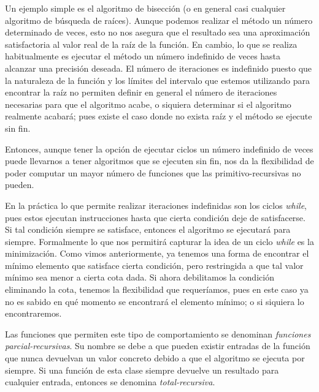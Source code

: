 Un ejemplo simple es el algoritmo de bisección (o en general casi cualquier algoritmo de búsqueda de raíces). Aunque podemos realizar el método un número determinado de veces, esto no nos asegura que el resultado sea una aproximación satisfactoria al valor real de la raíz de la función. En cambio, lo que se realiza habitualmente es ejecutar el método un número indefinido de veces hasta alcanzar una precisión deseada. El número de iteraciones es indefinido puesto que la naturaleza de la función y los límites del intervalo que estemos utilizando para encontrar la raíz no permiten definir en general el número de iteraciones necesarias para que el algoritmo acabe, o siquiera determinar si el algoritmo realmente acabará; pues existe el caso donde no exista raíz y el método se ejecute sin fin.

Entonces, aunque tener la opción de ejecutar ciclos un número indefinido de veces puede llevarnos a tener algoritmos que se ejecuten sin fin, nos da la flexibilidad de poder computar un mayor número de funciones que las primitivo-recursivas no pueden.

En la práctica lo que permite realizar iteraciones indefinidas son los ciclos \emph{while}, pues estos ejecutan instrucciones hasta que cierta condición deje de satisfacerse. Si tal condición siempre se satisface, entonces el algoritmo se ejecutará para siempre. Formalmente lo que nos permitirá capturar la idea de un ciclo \emph{while} es la minimización. Como vimos anteriormente, ya tenemos una forma de encontrar el mínimo elemento que satisface cierta condición, pero restringida a que tal valor mínimo sea menor a cierta cota dada. Si ahora debilitamos la condición eliminando la cota, tenemos la flexibilidad que requeríamos, pues en este caso ya no es sabido en qué momento se encontrará el elemento mínimo; o si siquiera lo encontraremos.

Las funciones que permiten este tipo de comportamiento se denominan \emph{funciones parcial-recursivas}. Su nombre se debe a que pueden existir entradas de la función que nunca devuelvan un valor concreto debido a que el algoritmo se ejecuta por siempre. Si una función de esta clase siempre devuelve un resultado para cualquier entrada, entonces se denomina \emph{total-recursiva}.

